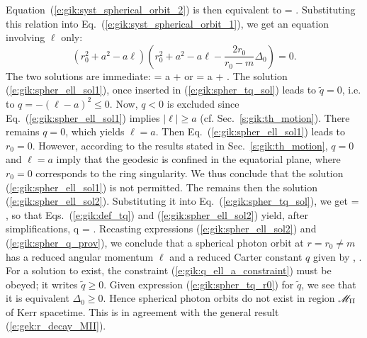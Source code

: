 Equation~(\ref{e:gik:syst_spherical_orbit_2}) is then equivalent to
\be \label{e:gik:spher_tq_sol}
     =  .
\ee
Substituting this relation into Eq.~(\ref{e:gik:syst_spherical_orbit_1}), we get
an equation involving $\ell$ only:
\[
    (r_0^2 + a^2 - a \ell) \left( r_0^2 + a^2 - a \ell - \frac{2 r_0}{r_0 - m} \Delta_0 \right) = 0 .
\]
The two solutions are immediate:
\be \label{e:gik:spher_ell_sol1}
    \ell = a + 
\ee
or
\be \label{e:gik:spher_ell_sol2}
    \ell = a +   .
\ee
The solution (\ref{e:gik:spher_ell_sol1}), once inserted in (\ref{e:gik:spher_tq_sol})
leads to $\tilde{q} = 0$, i.e. to $q = - (\ell - a)^2 \leq 0$.
Now, $q<0$ is excluded since Eq.~(\ref{e:gik:spher_ell_sol1}) implies $|\ell| \geq a$
(cf. Sec.~\ref{s:gik:th_motion}). There remains $q=0$, which yields $\ell = a$. Then
Eq.~(\ref{e:gik:spher_ell_sol1}) leads to $r_0 = 0$. However, according to the
results stated in Sec.~\ref{s:gik:th_motion}, $q=0$ and $\ell = a$
imply that the geodesic is confined in the equatorial plane, where $r_0=0$
corresponds to the ring singularity. We thus conclude that the solution
(\ref{e:gik:spher_ell_sol1}) is not permitted. The remains then the solution
(\ref{e:gik:spher_ell_sol2}). Substituting it into Eq.~(\ref{e:gik:spher_tq_sol}), we get
\be \label{e:gik:spher_tq_r0}
     =  ,
\ee
so that Eqs.~(\ref{e:gik:def_tq}) and (\ref{e:gik:spher_ell_sol2}) yield, after simplifications,
\be \label{e:gik:spher_q_prov}
    q = \left[ - r_0^3 + 6 m r_0^2 - 9 m^2 r_0 + 4 a^2 m \right] .
\ee
Recasting expressions (\ref{e:gik:spher_ell_sol2}) and (\ref{e:gik:spher_q_prov}), we
conclude that a spherical photon orbit at $r=r_0\neq m$ has a reduced angular momentum $\ell$
and a reduced Carter constant $q$ given by
\be \label{e:gik:spher_ell_r0}
   ,
\ee
\be \label{e:gik:spher_q_r0}
     .
\ee
For a solution to exist, the constraint (\ref{e:gik:q_ell_a_constraint}) must
be obeyed; it writes $\tilde{q} \geq 0$. Given expression (\ref{e:gik:spher_tq_r0}) for
$\tilde{q}$, we see that it is equivalent $\Delta_0 \geq 0$. Hence spherical photon orbits
do not exist in region $\mathscr{M}_{\rm II}$ of Kerr spacetime. This is in agreement with the
general result (\ref{e:gek:r_decay_MII}).

